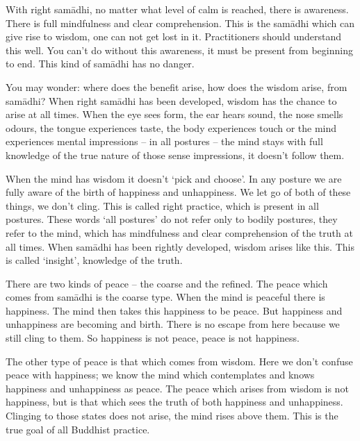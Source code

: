 With right sam\=adhi, no matter what level of calm is reached, there is awareness. There is full mindfulness and clear comprehension. This is the sam\=adhi which can give rise to wisdom, one can not get lost in it. Practitioners should understand this well. You can't do without this awareness, it must be present from beginning to end. This kind of sam\=adhi has no danger. 

You may wonder: where does the benefit arise, how does the wisdom arise, from sam\=adhi? When right sam\=adhi has been developed, wisdom has the chance to arise at all times. When the eye sees form, the ear hears sound, the nose smells odours, the tongue experiences taste, the body experiences touch or the mind experiences mental impressions -- in all postures -- the mind stays with full knowledge of the true nature of those sense impressions, it doesn't follow them. 

When the mind has wisdom it doesn't `pick and choose'. In any posture we are fully aware of the birth of happiness and unhappiness. We let go of both of these things, we don't cling. This is called right practice, which is present in all postures. These words `all postures' do not refer only to bodily postures, they refer to the mind, which has mindfulness and clear comprehension of the truth at all times. When sam\=adhi has been rightly developed, wisdom arises like this. This is called `insight', knowledge of the truth. 

There are two kinds of peace -- the coarse and the refined. The peace which comes from sam\=adhi is the coarse type. When the mind is peaceful there is happiness. The mind then takes this happiness to be peace. But happiness and unhappiness are becoming and birth. There is no escape from  here because we still cling to them. So happiness is not peace, peace is not happiness. 

The other type of peace is that which comes from wisdom. Here we don't confuse peace with happiness; we know the mind which contemplates and knows happiness and unhappiness as peace. The peace which arises from wisdom is not happiness, but is that which sees the truth of both happiness and unhappiness. Clinging to those states does not arise, the mind rises above them. This is the true goal of all Buddhist practice. 
